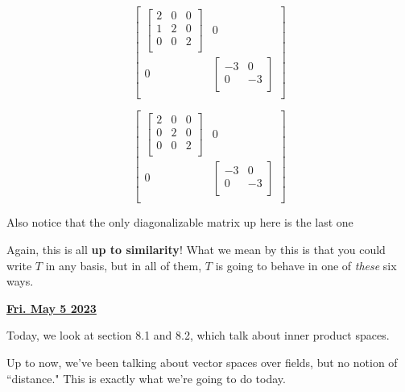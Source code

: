 \documentclass[12pt]{article}
\renewcommand{\date}[1]{\underline{\bf #1}}
\begin{document}
{\begin{multicols}{3}
      \[
        \begin{bmatrix}
          \begin{bmatrix}
            2 & 0 & 0\\
            1 & 2 & 0 \\
            0 & 0 & 2 \\
          \end{bmatrix} & 0 \\
          0 & \begin{bmatrix}
            -3 & 0 \\
            0 & -3 \\
          \end{bmatrix} \\
        \end{bmatrix}
      \]

      \[
        \begin{bmatrix}
          \begin{bmatrix}
            2 & 0 & 0\\
            0 & 2 & 0 \\
            0 & 0 & 2 \\
          \end{bmatrix} & 0 \\
          0 & \begin{bmatrix}
            -3 & 0 \\
            0 & -3 \\
          \end{bmatrix} \\
        \end{bmatrix}
      \]
    \end{multicols}

    Also notice that the only diagonalizable matrix up here is the last one

    Again, this is all {\bf up to similarity}! What we mean by this is that you
    could write $T$ in any basis, but in all of them, $T$ is going to behave in
    one of {\it these} six ways.
  }

  \date{Fri. May 5 2023}


  Today, we look at section 8.1 and 8.2, which talk about inner product spaces.

  Up to now, we've been talking about vector spaces over fields, but no notion
  of ``distance." This is exactly what we're going to do today.
\end{document}
